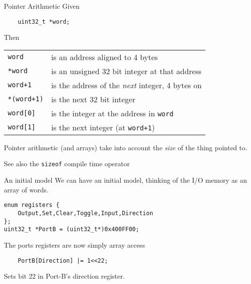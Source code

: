 \documentclass[xcolor=svgnames]{beamer}
\begin{document}
\begin{frame}[fragile]{Pointer Arithmetic}
Given
\begin{verbatim}
    uint32_t *word;
\end{verbatim}
Then\\
\begin{tabular}{ll}
    \texttt{word} & is an address aligned to 4 bytes \\
    \texttt{*word} & is an unsigned 32 bit integer at that address \\
    \texttt{word+1} & is the address of the \emph{next} integer, \alert{4 bytes on} \\
    \texttt{*(word+1)} & is the \alert{next} 32 bit integer\\
    \texttt{word[0]} & is the integer \alert{at} the address in \texttt{word}\\
    \texttt{word[1]} & is the next integer (at \texttt{word+1})
\end{tabular}
Pointer arithmetic (and arrays) take into account the \emph{size} of the thing pointed to.

\begin{exampleblock}{See also}
    the \texttt{sizeof} compile time operator
\end{exampleblock}
\end{frame}

\begin{frame}[fragile]{An initial model}
    We can have an initial model, thinking of the I/O memory as an array of words.

    \begin{tcolorbox}
        \begin{verbatim}
enum registers {
    Output,Set,Clear,Toggle,Input,Direction
};
uint32_t *PortB = (uint32_t*)0x400FF00;
        \end{verbatim}
    \end{tcolorbox}

    The ports registers are now simply array access

    \begin{tcolorbox}
        \begin{verbatim}
    PortB[Direction] |= 1<<22;
        \end{verbatim}
    \end{tcolorbox}
    Sets bit 22 in Port-B's direction register.
\end{frame}
\end{document}
